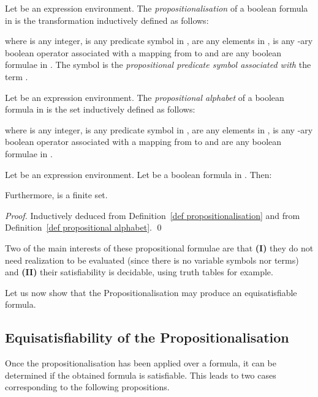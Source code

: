 \documentclass[a4paper]{llncs}
\begin{document}
  \begin{definition}[Propositionalisation]\label{def propositionalisation}
    Let  be an expression environment. The \emph{propositionalisation} of a boolean formula  in  is the transformation  inductively defined as follows:
        
        where  is any integer,  is any predicate symbol in ,  are any  elements in ,  is any -ary boolean operator associated with a mapping  from  to  and  are any  boolean formulae in . The symbol  is the \emph{propositional predicate symbol associated with} the term .
  \end{definition}
    
  
  \begin{definition}\label{def propositional alphabet}
    Let  be an expression environment. The \emph{propositional alphabet} of a boolean formula  in  is the set  inductively defined as follows:
        
        where  is any integer,  is any predicate symbol in ,  are any  elements in ,  is any -ary boolean operator associated with a mapping  from  to  and  are any  boolean formulae in .
  \end{definition}
  
  \begin{proposition}
    Let  be an expression environment. Let  be a boolean formula in . Then:
            
    Furthermore,  is a finite set.
  \end{proposition}
  \begin{proof}
    Inductively deduced from Definition~\ref{def propositionalisation} and from Definition~\ref{def propositional alphabet}.
    \qed
  \end{proof}
  
  Two of the main interests of these propositional formulae are that \textbf{(I)} they do not need realization to be evaluated (since there is no variable symbols nor terms) and \textbf{(II)} their satisfiability is decidable, using truth tables for example.
  
  Let us now show that the Propositionalisation may produce an equisatisfiable formula.
  
  \subsection{Equisatisfiability of the Propositionalisation}
  
  Once the propositionalisation has been applied over a formula, it can be determined if the obtained formula is satisfiable. This leads to two cases corresponding to the following propositions.
  
\end{document}
